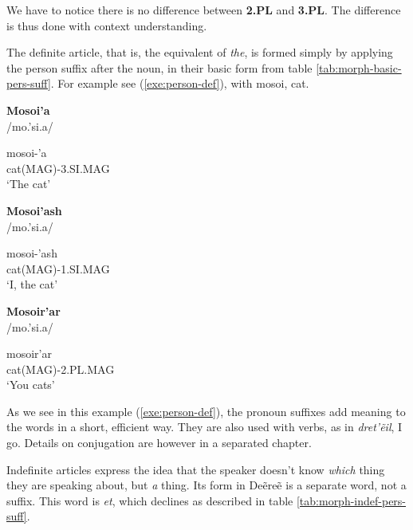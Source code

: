 We have to notice there is no difference between \textbf{2.PL} and \textbf{3.PL}. The difference is
thus done with context understanding.

The definite article, that is, the equivalent of \emph{the}, is formed simply by applying the person
suffix after the noun, in their basic form from table \ref{tab:morph-basic-pers-suff}. For example
see (\ref{exe:person-def}), with \gls{mosoi}, cat.

\begin{exe}
\ex\label{exe:person-def}
\begin{xlist}
\ex\textbf{Mosoi’a}\\
/mo.'s{\ipaO}i.a/

\gll mosoi-’a\\
cat(MAG)-3.SI.MAG\\
\trans ‘The cat’

\ex\textbf{Mosoi’ash}\\
/mo.'s{\ipaO}i.a/

\gll mosoi-’ash\\
cat(MAG)-1.SI.MAG\\
\trans ‘I, the cat’

\ex\textbf{Mosoir’ar}\\
/mo.'s{\ipaO}i{\ipaR}.a{\ipaR}/

\gll mosoir’ar\\
cat(MAG)-2.PL.MAG\\
\trans ‘You cats’
\end{xlist}
\end{exe}

As we see in this example (\ref{exe:person-def}), the pronoun suffixes add meaning to the words in a
short, efficient way. They are also used with verbs, as in \emph{dret’ẽil}, I go. Details on
conjugation are however in a separated chapter.

Indefinite articles express the idea that the speaker doesn’t know \emph{which} thing they are
speaking about, but \emph{a} thing. Its form in Deẽreẽ is a separate word, not a suffix. This word
is \emph{et}, which declines as described in table \ref{tab:morph-indef-pers-suff}.

